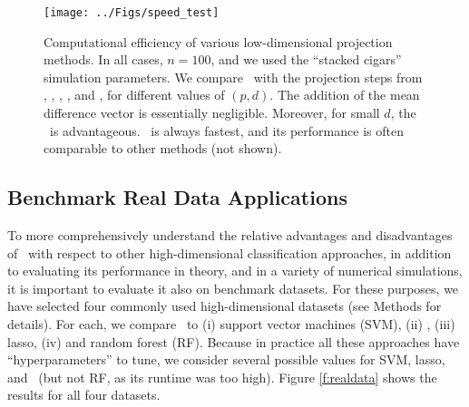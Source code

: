 \documentclass[10pt]{article}
\begin{document}
\begin{figure}[h!]
\centering
\texttt{[image: ../Figs/speed\_test]}
\caption{
Computational efficiency of various low-dimensional projection methods. In all cases, $n=100$, and we used the ``stacked cigars'' simulation parameters.   We compare \Pca~with the projection steps from \Lol, \Qoq, \Lrl, \Lfl, and \Lal, for different values of $(p,d)$.  The addition of the mean difference vector is essentially negligible.  Moreover, for small $d$, the \Lfl~is advantageous.  \Lal~is always fastest, and its performance is often comparable to other methods (not shown).
}
\label{f:speed}
\end{figure}




\subsection*{Benchmark Real Data Applications}


To more comprehensively understand the relative advantages and disadvantages of \Lol~with respect to other high-dimensional classification approaches, in addition to evaluating its performance in theory, and in a variety of numerical simulations, 
 it is important to evaluate it also on benchmark datasets.  For these purposes, we have selected four commonly used high-dimensional datasets (see Methods for details).  For each, we compare \Lol~to (i) support vector machines (SVM), (ii) , (iii) lasso, (iv) and random forest (RF).  Because in practice all these approaches have ``hyperparameters'' to tune, we consider several possible values for  SVM, lasso, and \Lol~(but not RF, as its runtime was too high).  Figure \ref{f:realdata} shows the results for all four datasets.  
\end{document}
